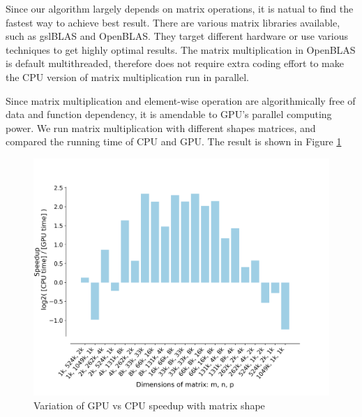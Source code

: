 \documentclass[9pt,twocolumn,twoside,lineno]{gsag3jnl}
\begin{document}
Since our algorithm largely depends on matrix operations, it is natual to find the fastest way to achieve best result. 
There are various matrix libraries available, such as gslBLAS and OpenBLAS. 
They target different hardware or use various techniques to get highly optimal results. 
The matrix multiplication in OpenBLAS is default multithreaded, therefore does not require extra coding effort to make the CPU version of matrix multiplication run in parallel.

Since matrix multiplication and element-wise operation are algorithmically free of data and function dependency, it is amendable to GPU's parallel computing power. 
We run matrix multiplication with different shapes matrices, and compared the running time of CPU and GPU. 
The result is shown in Figure \ref{GPUCPUShape}


\begin{figure}[!htb]
	\centering
	\caption{Variation of GPU vs CPU speedup with matrix shape
	}
	\label{GPUCPUShape}
	\includegraphics[scale = 0.36]{figs/speedup.png}
\end{figure} 

 
\end{document}
